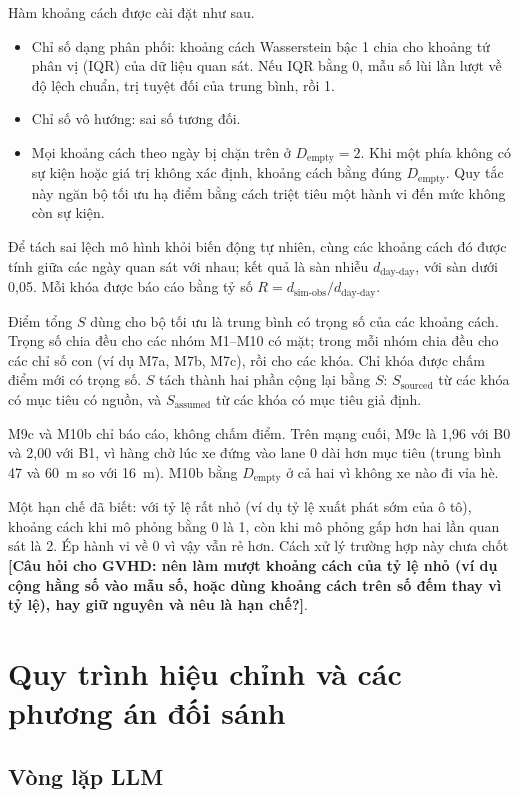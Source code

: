 \documentclass[../DoAn.tex]{subfiles}
\begin{document}
Hàm khoảng cách được cài đặt như sau.
\begin{itemize}
    \item Chỉ số dạng phân phối: khoảng cách Wasserstein bậc 1 chia cho khoảng tứ phân vị (IQR) của dữ liệu quan sát. Nếu IQR bằng 0, mẫu số lùi lần lượt về độ lệch chuẩn, trị tuyệt đối của trung bình, rồi 1.
    \item Chỉ số vô hướng: sai số tương đối.
    \item Mọi khoảng cách theo ngày bị chặn trên ở $D_{\text{empty}} = 2$. Khi một phía không có sự kiện hoặc giá trị không xác định, khoảng cách bằng đúng $D_{\text{empty}}$. Quy tắc này ngăn bộ tối ưu hạ điểm bằng cách triệt tiêu một hành vi đến mức không còn sự kiện.
\end{itemize}
Để tách sai lệch mô hình khỏi biến động tự nhiên, cùng các khoảng cách đó được tính giữa các ngày quan sát với nhau; kết quả là sàn nhiễu $d_{\text{day-day}}$, với sàn dưới 0,05. Mỗi khóa được báo cáo bằng tỷ số $R = d_{\text{sim-obs}}/d_{\text{day-day}}$.

Điểm tổng $S$ dùng cho bộ tối ưu là trung bình có trọng số của các khoảng cách. Trọng số chia đều cho các nhóm M1--M10 có mặt; trong mỗi nhóm chia đều cho các chỉ số con (ví dụ M7a, M7b, M7c), rồi cho các khóa. Chỉ khóa được chấm điểm mới có trọng số. $S$ tách thành hai phần cộng lại bằng $S$: $S_{\text{sourced}}$ từ các khóa có mục tiêu có nguồn, và $S_{\text{assumed}}$ từ các khóa có mục tiêu giả định.

M9c và M10b chỉ báo cáo, không chấm điểm. Trên mạng cuối, M9c là 1,96 với B0 và 2,00 với B1, vì hàng chờ lúc xe đứng vào lane 0 dài hơn mục tiêu (trung bình 47 và 60~m so với 16~m). M10b bằng $D_{\text{empty}}$ ở cả hai vì không xe nào đi vỉa hè.

Một hạn chế đã biết: với tỷ lệ rất nhỏ (ví dụ tỷ lệ xuất phát sớm của ô tô), khoảng cách khi mô phỏng bằng 0 là 1, còn khi mô phỏng gấp hơn hai lần quan sát là 2. Ép hành vi về 0 vì vậy vẫn rẻ hơn. Cách xử lý trường hợp này chưa chốt \textbf{[Câu hỏi cho GVHD: nên làm mượt khoảng cách của tỷ lệ nhỏ (ví dụ cộng hằng số vào mẫu số, hoặc dùng khoảng cách trên số đếm thay vì tỷ lệ), hay giữ nguyên và nêu là hạn chế?]}.

\section{Quy trình hiệu chỉnh và các phương án đối sánh}
\label{section:3.8}

\subsection{Vòng lặp LLM}
\end{document}
